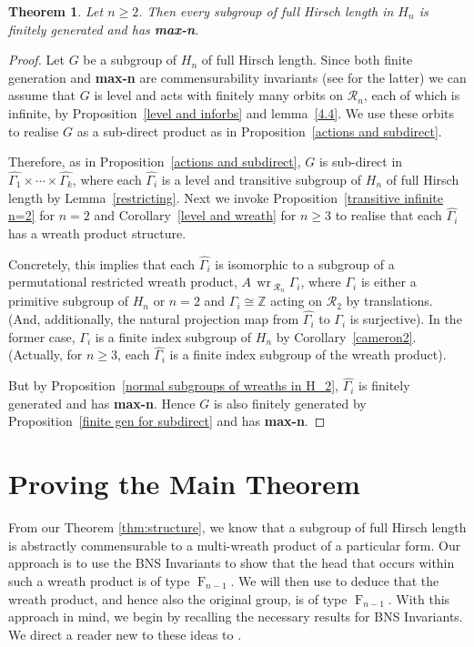 \documentclass[11pt,a4paper]{amsart}
\newtheorem{theorem}{Theorem}[section]
\theoremstyle{definition}
\theoremstyle{remark}
\newcommand{\Z}{\mathbb Z}
\newcommand{\Ra}{\mathcal{R}}
\newcommand{\FFF}{\operatorname{F}}
\renewcommand{\wr}{\operatorname{\,wr\,}}
\begin{document}
\begin{theorem}
	\label{finite gen}
Let $n\ge2$. Then every subgroup of full Hirsch length in $H_n$ is finitely generated and has \textbf{max-n}. 
\end{theorem}
\begin{proof}
	Let $G$ be a subgroup of $H_n$ of full Hirsch length. Since both finite generation and \textbf{max-n } are commensurability invariants (see \cite[Exercise 3.1.11]{Robinson} for the latter) we can assume that $G$ is level and acts with finitely many orbits on $\Ra_n$, each of which is infinite, by Proposition~\ref{level and inforbs} and lemma~\ref{4.4}. We use these orbits to realise $G$ as a sub-direct product as in Proposition~\ref{actions and subdirect}. 

	
	Therefore, as in Proposition~\ref{actions and subdirect}, $G$ is sub-direct in $\widehat{\Gamma_1} \times \cdots \times \widehat{\Gamma_k}$, where each $\widehat{\Gamma_i}$ is a level and transitive subgroup of $H_n$ of full Hirsch length by Lemma~\ref{restricting}. Next we invoke Proposition~\ref{transitive infinite n=2} for $n=2$ and	Corollary~\ref{level and wreath} for $n \ge 3$ to realise that each $\widehat{\Gamma_i}$ has a wreath product structure. 	

	
	Concretely, this implies that each $\widehat{\Gamma_i}$ is isomorphic to a subgroup of a permutational restricted wreath product, $A \wr_{\Ra_n} {\Gamma_i}$, where ${\Gamma_i}$ is either a primitive subgroup of $H_n$ or $n=2$ and ${\Gamma_i} \cong \Z$ acting on $\Ra_2$ by translations. (And, additionally, the natural projection map from $\widehat{\Gamma_i}$ to ${\Gamma_i}$ is surjective). In the former case,  ${\Gamma_i}$ is a finite index subgroup of $H_n$ by Corollary~\ref{cameron2}. (Actually, for $n \geq 3$, each $\widehat{\Gamma_i}$ is a finite index subgroup of the wreath product). 
	
	But by Proposition~\ref{normal subgroups of wreaths in H_2}, $\widehat{\Gamma_i}$ is finitely generated and has \textbf{max-n}. Hence $G$ is also finitely generated by Proposition~\ref{finite gen for subdirect} and has \textbf{max-n}.
\end{proof}

\section{Proving the Main Theorem}\label{sec:thmAproof}
From our Theorem \ref{thm:structure}, we know that a subgroup of full Hirsch length is abstractly commensurable to a multi-wreath product of a particular form. Our approach is to use the BNS Invariants to show that the head that occurs within such a wreath product is of type $\FFF_{n-1}$. We will then use \cite[Theorem A]{KM1} to deduce that the wreath product, and hence also the original group, is of type $\FFF_{n-1}$. With this approach in mind, we begin by recalling the necessary results for BNS Invariants. We direct a reader new to these ideas to \cite{BNSdefinitions}.
\end{document}
